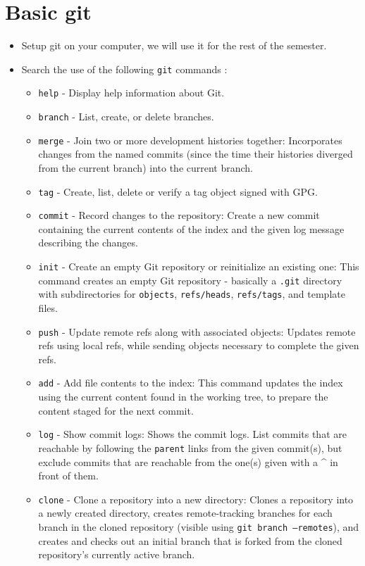 \documentclass[a4paper]{article}
\begin{document}
\section{Basic git}
\begin{itemize}
    \item Setup git on your computer, we will use it for the rest of the semester.
    \item Search the use of the following \texttt{git} commands \cite{git}:
    \begin{itemize}
        \item \texttt{help} - Display help information about Git.
        \item \texttt{branch} - List, create, or delete branches.
        \item \texttt{merge} -  Join two or more development histories together: Incorporates changes from the named commits (since the time their histories diverged from the current branch) into the current branch.
        \item \texttt{tag} - Create, list, delete or verify a tag object signed with GPG.
        \item \texttt{commit} - Record changes to the repository: Create a new commit containing the current contents of the index and the given log message describing the changes.
        \item \texttt{init} - Create an empty Git repository or reinitialize an existing one: This command creates an empty Git repository - basically a \texttt{.git} directory with subdirectories for \texttt{objects}, \texttt{refs/heads}, \texttt{refs/tags}, and template files.
        \item \texttt{push} - Update remote refs along with associated objects: Updates remote refs using local refs, while sending objects necessary to complete the given refs.
        \item \texttt{add} - Add file contents to the index: This command updates the index using the current content found in the working tree, to prepare the content staged for the next commit.
        \item \texttt{log} - Show commit logs: Shows the commit logs. List commits that are reachable by following the \texttt{parent} links from the given commit(s), but exclude commits that are reachable from the one(s) given with a \^{} in front of them.
        \item \texttt{clone} - Clone a repository into a new directory: Clones a repository into a newly created directory, creates remote-tracking branches for each branch in the cloned repository (visible using \texttt{git branch --remotes}), and creates and checks out an initial branch that is forked from the cloned repository’s currently active branch.

\end{itemize}
\end{itemize}
\end{document}
